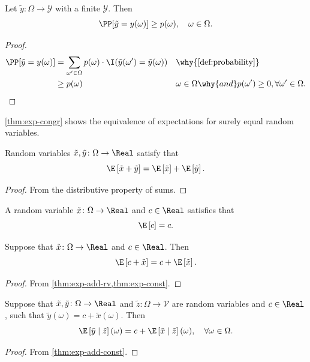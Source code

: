 \begin{lemma} \label{lem:prob-ge-measure}
  Let $\tilde{y}\colon \Omega \to \mathcal{Y}$ with a finite $\mathcal{Y}$. Then
  \[
   \PP[\tilde{y} = y(\omega)] \ge p(\omega ), \quad \omega \in \Omega . 
  \]
\end{lemma}
\begin{proof}
 \begin{align*}
   \PP[\tilde{y} = y(\omega)]
   &= \sum_{\omega' \in \Omega } p(\omega) \cdot \I(\tilde{y}(\omega') = \tilde{y}(\omega)) && \why{\cref{def:probability}} \\
   &\ge p(\omega ) && \omega \in \Omega \why{ and } p(\omega') \ge 0, \forall \omega '\in \Omega. 
 \end{align*}
\end{proof}


\begin{remark}
\cref{thm:exp-congr} shows the equivalence of expectations for surely equal random variables. 
\end{remark}

\begin{theorem} \label{thm:exp-add-rv}
  Random variables $\tilde{x}, \tilde{y} \colon \Omega \to \Real$ satisfy that
  \[
    \E \left[ \tilde{x} + \tilde{y} \right]
    =
    \E \left[ \tilde{x} \right] + \E \left[ \tilde{y} \right].
  \]
\end{theorem}
\begin{proof}
  From the distributive property of sums. 
\end{proof}

\begin{theorem} \label{thm:exp-const}
  A random variable $\tilde{x}\colon \Omega \to \Real$ and $c\in \Real $ satisfies that
  \[
   \E \left[ c \right] = c.
  \]
\end{theorem}


\begin{theorem} \label{thm:exp-add-const}
Suppose that $\tilde{x} \colon \Omega \to \Real$ and $c\in \Real$. Then
\[
\E \left[ c + \tilde{x} \right] = c + \E \left[ \tilde{x} \right].
\]
\end{theorem}
\begin{proof}
  From \cref{thm:exp-add-rv,thm:exp-const}.
\end{proof}


\begin{theorem} \label{thm:exp-cnd-rv-add-const}
Suppose that $\tilde{x}, \tilde{y} \colon \Omega \to \Real$ and $\tilde{z}\colon \Omega \to \mathcal{V}$ are random variables and $c\in \Real$, such that $\tilde{y}(\omega) = c + \tilde{x}(\omega)$. Then
\[
\E \left[ \tilde{y} \mid \tilde{z} \right](\omega) = c + \E \left[ \tilde{x} \mid  \tilde{z} \right](\omega), \quad \forall \omega \in \Omega.
\]
\end{theorem}
\begin{proof}
From \cref{thm:exp-add-const}.
\end{proof}

